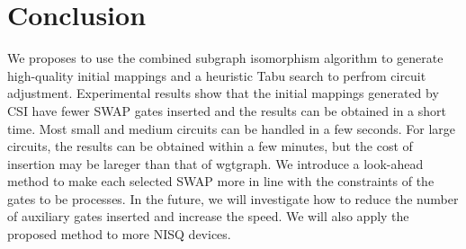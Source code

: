 \documentclass[runningheads]{llncs}
\begin{document}
\section{Conclusion}
\label{Conclusion}
We proposes to use the combined subgraph isomorphism algorithm to generate high-quality initial mappings and a heuristic Tabu search to perfrom circuit adjustment.
Experimental results show that the initial mappings generated by CSI have fewer SWAP gates inserted and the results can be obtained in a short time. Most small and medium circuits can be handled in a few seconds.
For large circuits, the results can be obtained within a few minutes,
but the cost of insertion may be lareger than that of wgtgraph.
We introduce a look-ahead method to make each selected SWAP more in line with the constraints of the gates to be processes.
In the future, we will investigate how to reduce the number of auxiliary gates inserted and increase the speed. We will also apply the proposed method to more NISQ devices.





\newpage
\appendix
\end{document}

